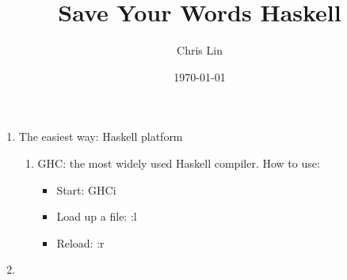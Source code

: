 \documentclass[a4paper,10pt]{article}
\title{Save Your Words Haskell}
\author{Chris Lin}
\date{\today}
\begin{document}
\maketitle

\begin{enumerate}
 \item The easiest way: Haskell platform
 \begin{enumerate}
  \item GHC: the most widely used Haskell compiler.
  \newline How to use:
  \begin{itemize}
   \item Start: GHCi
   \item Load up a file: :l
   \item Reload: :r
  \end{itemize}
 \end{enumerate} 
 \item 
\end{enumerate}
\end{document}
